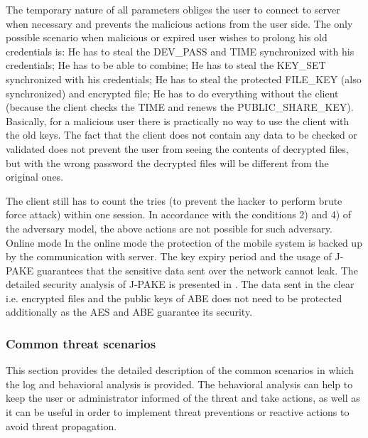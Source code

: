\documentclass[twocolumn]{svjour3}          %
\begin{document}
The temporary nature of all parameters obliges the user to connect to server when necessary and prevents the malicious actions from the user side. The only possible scenario when malicious or expired user wishes to prolong his old credentials is:
He has to steal the DEV\_PASS and TIME synchronized with his credentials;
He has to be able to combine;
He has to steal the KEY\_SET synchronized with his credentials;
He has to steal the protected FILE\_KEY (also synchronized) and encrypted file;
He has to do everything without the client (because the client checks the TIME and renews the PUBLIC\_SHARE\_KEY).
Basically, for a malicious user there is practically no way to use the client with the old keys. The fact that the client does not contain any data to be checked or validated does not prevent the user from seeing the contents of decrypted files, but with the wrong password the decrypted files will be different from the original ones.

The client still has to count the tries (to prevent the hacker to perform brute force attack) within one session. In accordance with the conditions 2) and 4) of the adversary model, the above actions are not possible for such adversary.
Online mode
In the online mode the protection of the mobile system is backed up by the communication with server. The key expiry period and the usage of J-PAKE \cite{hao2010j,hao2008password} guarantees that the sensitive data sent over the network cannot leak. The detailed security analysis of J-PAKE is presented in \cite{toorani2014security}. The data sent in the clear i.e. encrypted files and the public keys of ABE does not need to be protected additionally as the AES and ABE guarantee its security.

\subsubsection{Common threat scenarios}
\label{sec_common}
This section provides the detailed description of the common scenarios in which the log and behavioral analysis is provided. The behavioral analysis can help to keep the user or administrator informed of the threat and take actions, as well as it can be useful in order to implement threat preventions or reactive actions to avoid threat propagation.
\end{document}
